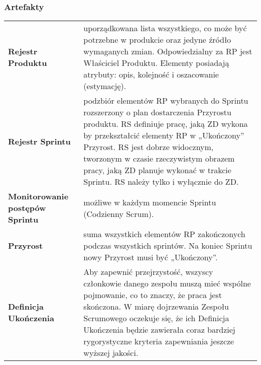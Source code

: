 \documentclass[../main.tex]{subfiles}
\begin{document}
    \subsubsection{Artefakty}
    \begin{table}[H]
        \begin{center}
            \begin{tabular}{ p{} p{} }
                \textbf{Rejestr Produktu}
                &
                uporządkowana lista wszystkiego,
                co może być potrzebne w produkcie oraz jedyne źródło wymaganych zmian.
                Odpowiedzialny za RP jest Właściciel Produktu.
                Elementy posiadają atrybuty: opis, kolejność i oszacowanie (estymację).
                \\

                \cmidrule(r){1-1}\cmidrule(l){2-2}
                \textbf{Rejestr Sprintu}
                &
                podzbiór elementów RP wybranych do Sprintu rozszerzony o plan
                dostarczenia Przyrostu produktu.
                RS definiuje pracę, jaką ZD wykona by przekształcić elementy
                RP w „Ukończony” Przyrost.
                RS jest dobrze widocznym, tworzonym w czasie rzeczywistym obrazem pracy, jaką ZD planuje wykonać w trakcie Sprintu.
                RS należy tylko i wyłącznie do ZD.
                \\

                \cmidrule(r){1-1}\cmidrule(l){2-2}
                \textbf{Monitorowanie postępów Sprintu}
                &
                możliwe w każdym momencie Sprintu (Codzienny Scrum).
                \\

                \cmidrule(r){1-1}\cmidrule(l){2-2}
                \textbf{Przyrost}
                &
                suma wszystkich elementów RP zakończonych podczas wszystkich sprintów.
                Na koniec Sprintu nowy Przyrost musi być „Ukończony”.
                \\

                \cmidrule(r){1-1}\cmidrule(l){2-2}
                \textbf{Definicja Ukończenia}
                &
                Aby zapewnić przejrzystość, wszyscy członkowie danego zespołu muszą mieć wspólne
                pojmowanie, co to znaczy, że praca jest skończona. W miarę dojrzewania Zespołu Scrumowego oczekuje się, że ich Definicja Ukończenia będzie
                zawierała coraz bardziej rygorystyczne kryteria zapewniania jeszcze wyższej jakości.
                \\
            \end{tabular}
        \end{center}
    \end{table}
\end{document}
